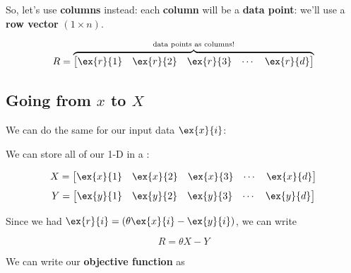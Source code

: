         So, let's use \textbf{columns} instead: each \textbf{column} will be a \textbf{data point}: we'll use a \textbf{row vector} $(1 \times n)$. 
        
        \begin{equation}
            R =
            \overbrace{
            \begin{bmatrix}
              \ex{r}{1} & \ex{r}{2} & \ex{r}{3} & \cdots & \ex{r}{d} 
            \end{bmatrix}
            }^{\text{data points as columns!}}
        \end{equation}
        
    \subsection{Going from $x$ to $X$}
    
        We can do the same for our input data $\ex{x}{i}$:\\
        
        \begin{notation}
            We can store all of our 1-D  in a :
            
            \begin{equation*}
                X =
                \begin{bmatrix}
                  \ex{x}{1} & \ex{x}{2} & \ex{x}{3} & \cdots & \ex{x}{d}
                \end{bmatrix}
            \end{equation*}
            \begin{equation*}
                Y =
                \begin{bmatrix}
                  \ex{y}{1} & \ex{y}{2} & \ex{y}{3} & \cdots & \ex{y}{d}
                \end{bmatrix}
            \end{equation*}
        \end{notation}
        
        Since we had $\ex{r}{i} = (\theta \ex{x}{i} - \ex{y}{i} )$, we can write 
        
        \begin{equation}
            R = \theta X - Y
        \end{equation}
        
        We can write our \textbf{objective function} as
        
